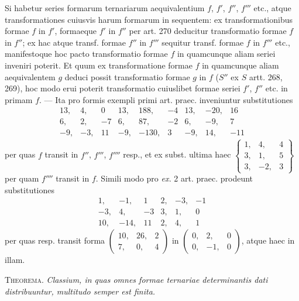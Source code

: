 Si habetur series formarum ternariarum aequivalentium \(f\), \(f'\), \(f''\), \(f'''\) etc., atque transformationes cuiusvis harum formarum in sequentem: ex transformationibus formae \(f\) in \(f'\), formaeque \(f'\) in \(f''\) per art. 270 deducitur transformatio formae \(f\) in \(f''\); ex hac atque transf. formae \(f''\) in \(f'''\) sequitur transf. formae \(f\) in \(f'''\) etc., manifestoque hoc pacto transformatio formae \(f\) in quamcunque aliam seriei inveniri poterit. Et quum ex transformatione formae \(f\) in quamcunque aliam aequivalentem \(g\) deduci possit transformatio formae \(g\) in \(f\) (\(S''\) ex \(S\) artt. 268, 269), hoc modo erui poterit transformatio cuiuslibet formae seriei \(f'\), \(f''\) etc. in primam \(f\). --- Ita pro formis exempli primi art. praec. inveniuntur substitutiones
\[
\begin{array}{rrr|rrr|rrr}
13,&4,&0&13,&188,&-4&13,&-20,&16\\
6,&2,&-7&6,&87,&-2&6,&-9,&7\\
-9,&-3,&11&-9,&-130,&3&-9,&14,&-11
\end{array}
\]
per quas \(f\) transit in \(f''\), \(f'''\), \(f''''\) resp., et ex subst. ultima haec \(\left\{\begin{smallmatrix}1,&4,&4\\3,&1,&5\\3,&-2,&3\end{smallmatrix}\right\}\) per quam \(f''''\) transit in \(f\). Simili modo pro \emph{ex.} 2 art. praec. prodeunt substitutiones
\[
\begin{array}{rrr|rrr}
1,&-1,&1&2,&-3,&-1\\
-3,&4,&-3&3,&1,&0\\
10,&-14,&11&2,&4,&1
\end{array}
\]
per quas resp. transit forma \(\left(\begin{smallmatrix}10,&26,&2\\7,&0,&4\end{smallmatrix}\right)\) in \(\left(\begin{smallmatrix}0,&2,&0\\0,&-1,&0\end{smallmatrix}\right)\), atque haec in illam.

\textsc{Theorema.} \emph{Classium, in quas omnes formae ternariae determinantis dati distribuuntur, multitudo semper est finita.}

